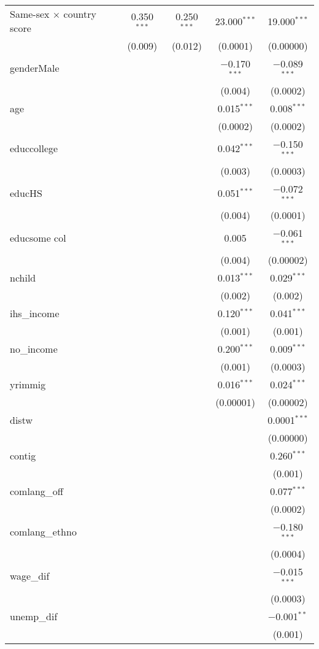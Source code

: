 \documentclass[
  11pt,
]{article}
\begin{document}
\begin{table}[!htbp]
\begin{tabular}{@{\extracolsep{5pt}}lcccc}
  Same-sex × country score & 0.350$^{***}$ & 0.250$^{***}$ & 23.000$^{***}$ & 19.000$^{***}$ \\ 
  & (0.009) & (0.012) & (0.0001) & (0.00000) \\ 
  genderMale &  &  & $-$0.170$^{***}$ & $-$0.089$^{***}$ \\ 
  &  &  & (0.004) & (0.0002) \\ 
  age &  &  & 0.015$^{***}$ & 0.008$^{***}$ \\ 
  &  &  & (0.0002) & (0.0002) \\ 
  educcollege &  &  & 0.042$^{***}$ & $-$0.150$^{***}$ \\ 
  &  &  & (0.003) & (0.0003) \\ 
  educHS &  &  & 0.051$^{***}$ & $-$0.072$^{***}$ \\ 
  &  &  & (0.004) & (0.0001) \\ 
  educsome col &  &  & 0.005 & $-$0.061$^{***}$ \\ 
  &  &  & (0.004) & (0.00002) \\ 
  nchild &  &  & 0.013$^{***}$ & 0.029$^{***}$ \\ 
  &  &  & (0.002) & (0.002) \\ 
  ihs\_income &  &  & 0.120$^{***}$ & 0.041$^{***}$ \\ 
  &  &  & (0.001) & (0.001) \\ 
  no\_income &  &  & 0.200$^{***}$ & 0.009$^{***}$ \\ 
  &  &  & (0.001) & (0.0003) \\ 
  yrimmig &  &  & 0.016$^{***}$ & 0.024$^{***}$ \\ 
  &  &  & (0.00001) & (0.00002) \\ 
  distw &  &  &  & 0.0001$^{***}$ \\ 
  &  &  &  & (0.00000) \\ 
  contig &  &  &  & 0.260$^{***}$ \\ 
  &  &  &  & (0.001) \\ 
  comlang\_off &  &  &  & 0.077$^{***}$ \\ 
  &  &  &  & (0.0002) \\ 
  comlang\_ethno &  &  &  & $-$0.180$^{***}$ \\ 
  &  &  &  & (0.0004) \\ 
  wage\_dif &  &  &  & $-$0.015$^{***}$ \\ 
  &  &  &  & (0.0003) \\ 
  unemp\_dif &  &  &  & $-$0.001$^{**}$ \\ 
  &  &  &  & (0.001) \\ 

\end{tabular}
\end{table}
\end{document}
